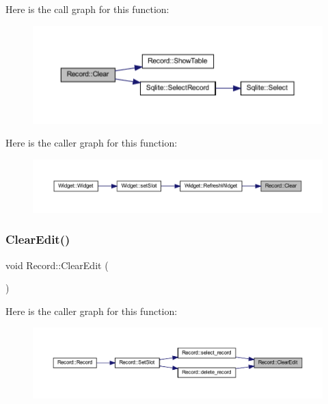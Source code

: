 Here is the call graph for this function\+:
\nopagebreak
\begin{figure}[H]
\begin{center}
\leavevmode
\includegraphics[width=350pt]{class_record_af70466cb248483ed2a32fb5a48a83cac_cgraph}
\end{center}
\end{figure}
Here is the caller graph for this function\+:
\nopagebreak
\begin{figure}[H]
\begin{center}
\leavevmode
\includegraphics[width=350pt]{class_record_af70466cb248483ed2a32fb5a48a83cac_icgraph}
\end{center}
\end{figure}
\mbox{\label{class_record_ad33ee61f2d53795e3090426aa3ba6af0}} 
\subsubsection{\texorpdfstring{ClearEdit()}{ClearEdit()}}
{\footnotesize\ttfamily void Record\+::\+Clear\+Edit (\begin{DoxyParamCaption}{ }\end{DoxyParamCaption})}

Here is the caller graph for this function\+:
\nopagebreak
\begin{figure}[H]
\begin{center}
\leavevmode
\includegraphics[width=350pt]{class_record_ad33ee61f2d53795e3090426aa3ba6af0_icgraph}
\end{center}
\end{figure}
\mbox{\label{class_record_a4c0e51ba399bdec6c9630b193914e7fb}} 
